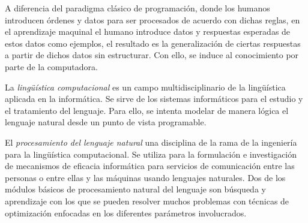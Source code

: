 A diferencia del paradigma clásico de programación, donde los humanos introducen órdenes y datos para ser procesados de acuerdo con dichas reglas, en el aprendizaje maquinal el humano introduce datos y respuestas esperadas de estos datos como ejemplos, el resultado es la generalización de ciertas respuestas a partir de dichos datos sin estructurar. Con ello, se induce al conocimiento por parte de la computadora.


La \emph{lingüística computacional} es un campo multidisciplinario de la lingüística aplicada en la informática. Se sirve de los sistemas informáticos para el estudio y el tratamiento del lenguaje. Para ello, se intenta modelar de manera lógica el lenguaje natural desde un punto de vista programable.

El \emph{procesamiento del lenguaje natural} una disciplina de la rama de la ingeniería para la lingüística computacional. Se utiliza para la formulación e investigación de mecanismos de eficacia informática para servicios de comunicación entre las personas o entre ellas y las máquinas usando lenguajes naturales. Dos de los módulos básicos de procesamiento natural del lenguaje son búsqueda y aprendizaje con los que se pueden resolver muchos problemas con técnicas de optimización enfocadas en los diferentes parámetros involucrados.